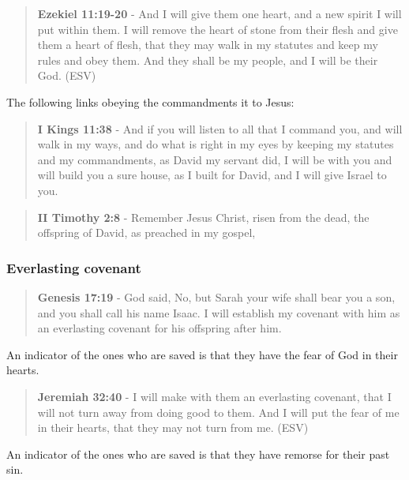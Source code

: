 \documentclass[11pt]{article}
\begin{document}
\begin{quote}
\textbf{Ezekiel 11:19-20} - And I will give them one heart, and a new spirit I will put within them. I will remove the heart of stone from their flesh and give them a heart of flesh, that they may walk in my statutes and keep my rules and obey them. And they shall be my people, and I will be their God. (ESV)
\end{quote}

The following links obeying the commandments it to Jesus:

\begin{quote}
\textbf{I Kings 11:38} - And if you will listen to all that I command you, and will walk in my ways, and do what is right in my eyes by keeping my statutes and my commandments, as David my servant did, I will be with you and will build you a sure house, as I built for David, and I will give Israel to you.
\end{quote}

\begin{quote}
\textbf{II Timothy 2:8} - Remember Jesus Christ, risen from the dead, the offspring of David, as preached in my gospel,
\end{quote}

\subsubsection{Everlasting covenant}
\label{sec:org9105abd}
\begin{quote}
\textbf{Genesis 17:19} - God said, No, but Sarah your wife shall bear you a son, and you shall call his name Isaac. I will establish my covenant with him as an everlasting covenant for his offspring after him.􀧁
\end{quote}

An indicator of the ones who are saved is that they have the fear of God in their hearts.

\begin{quote}
\textbf{Jeremiah 32:40} - I will make with them an everlasting covenant, that I will not turn away from doing good to them. And I will put the fear of me in their hearts, that they may not turn from me. (ESV)
\end{quote}

An indicator of the ones who are saved is that they have remorse for their past sin.
\end{document}
